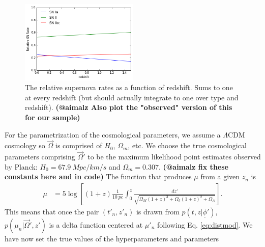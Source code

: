 \documentclass[12pt, onecolumn]{emulateapj}
\newcommand{\textul}{\underline}
\begin{document}
\begin{figure}
	\begin{center}
		\includegraphics[width=0.5\textwidth]{fig/relative_supernova_rate.png}
		\caption{The relative supernova rates as a function of redshift. Sums to one at every redshift (but should actually integrate to one over type and redshift).  \textbf{(@aimalz Also plot the "observed" version of this for our sample)}}
		\label{fig:relative_supernova_rates}
	\end{center}
\end{figure}

For the parametrization of the cosmological parameters, we assume a $\Lambda$CDM cosmology so $\vec{\Omega}$ is comprised of $H_{0}$, $\Omega_{m}$, etc.  We choose the true cosmological parameters comprising $\vec{\Omega}'$ to be the maximum likelihood point estimates observed by Planck: $H_{0}=67.9\ Mpc/km/s$ and $\Omega_{m}=0.307$.  \textbf{(@aimalz fix these constants here and in code)}  The function that produces $\mu$ from a given $z_{n}$ is 
\begin{align}
\label{eq:distmod}
\mu &= 5\log\left[(1+z)\frac{1}{10\ pc}\int_{0}^{z}\frac{dz'}{\sqrt{\Omega_{M}(1+z)^{3}+\Omega_{k}(1+z)^{2}+\Omega_{\Lambda}}}\right].
\end{align}
This means that once the pair $(t'_{n}, z'_{n})$ is drawn from $p(t, z | \textul{\phi}')$, $p(\mu_{n} | \vec{\Omega}', z')$ is a delta function centered at $\mu'_{n}$ following Eq. \ref{eq:distmod}.  We have now set the true values of the hyperparameters and parameters
\end{document}
